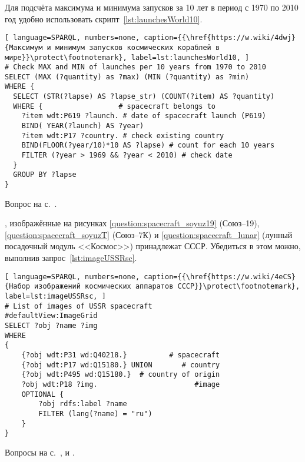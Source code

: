 \begin{task}
    Для подсчёта максимума и минимума запусков за 10 лет в период с 1970 по 2010 год удобно использовать скрипт~\ref{lst:launchesWorld10}.
    \begin{lstlisting}[ language=SPARQL, numbers=none, caption={{\href{https://w.wiki/4dwj}{Максимум и минимум запусков космических кораблей в мире}}\protect\footnotemark}, label=lst:launchesWorld10, ]
# Check MAX and MIN of launches per 10 years from 1970 to 2010
SELECT (MAX (?quantity) as ?max) (MIN (?quantity) as ?min)
WHERE {
  SELECT (STR(?lapse) AS ?lapse_str) (COUNT(?item) AS ?quantity)
  WHERE {                  # spacecraft belongs to
    ?item wdt:P619 ?launch. # date of spacecraft launch (P619)
    BIND( YEAR(?launch) AS ?year) 
    ?item wdt:P17 ?country. # check existing country
    BIND(FLOOR(?year/10)*10 AS ?lapse) # count for each 10 years
    FILTER (?year > 1969 && ?year < 2010) # check date
  } 
  GROUP BY ?lapse
} \end{lstlisting}
    \small{Вопрос на с.~\pageref{question:spacecraft_2}.}
\label{answer:max-min-space-launches}
\end{task}




\newpage
\begin{task}
    \label{answer:spacecraft_USSR}
    , 
    изображённые на рисунках \ref{question:spacecraft_soyuz19} (Союз--19), 
    \ref{question:spacecraft_soyuzT} (Союз--7К) и \ref{question:spacecraft_lunar} 
    (лунный посадочный модуль <<Космос>>) принадлежат СССР. 
    Убедиться в этом можно, выполнив запрос~\ref{lst:imageUSSRsc}.

    \begin{lstlisting}[ language=SPARQL, numbers=none, caption={{\href{https://w.wiki/4eCS}{Набор изображений космических аппаратов СССР}}\protect\footnotemark}, label=lst:imageUSSRsc, ]
# List of images of USSR spacecraft
#defaultView:ImageGrid
SELECT ?obj ?name ?img
WHERE
{
    {?obj wdt:P31 wd:Q40218.}          # spacecraft
    {?obj wdt:P17 wd:Q15180.} UNION       # country
    {?obj wdt:P495 wd:Q15180.}  # country of origin
    ?obj wdt:P18 ?img.                       #image
    OPTIONAL {
		?obj rdfs:label ?name 
		FILTER (lang(?name) = "ru")
	}
}\end{lstlisting}

\small{Вопросы на с.~\pageref{question:spacecraft_soyuz19}, 
    \pageref{question:spacecraft_soyuzT} и \pageref{question:spacecraft_lunar}.}
\end{task}

